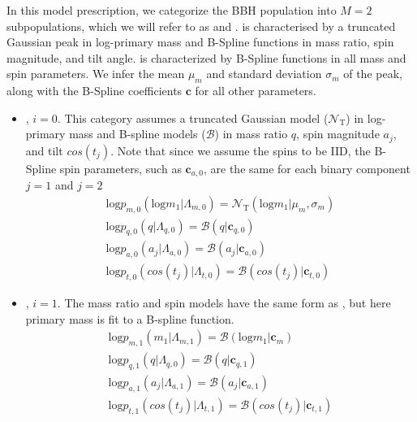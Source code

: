 \subsubsection{\base{}}
In this model prescription, we categorize the BBH population into $M=2$ subpopulations, which we will refer to as \popA{} and \popB{}. \popA is characterised by a truncated Gaussian peak in log-primary mass and B-Spline functions in mass ratio, spin magnitude, and tilt angle. \popB{} is characterized by B-Spline functions in all mass and spin parameters. We infer the mean $\mu_m$ and standard deviation $\sigma_m$ of the peak, along with the B-Spline coefficients $\mathbf{c}$ for all other parameters.

\begin{itemize}
    \item \popA{}, $i=0$. This category assumes a truncated Gaussian model ($\mathcal{N}_\text{T}$) in log-primary mass and B-spline models ($\mathcal{B}$) in mass ratio $q$, spin magnitude $a_j$, and tilt $cos(t_j)$. Note that since we assume the spins to be IID, the B-Spline spin parameters, such as $\mathbf{c}_{a,0}$, are the same for each binary component $j=1$ and $j=2$
    \begin{eqnarray} \label{eq:peakAbase}
        \text{log} p_{m,0}(\text{log} m_1| \Lambda_{m,0}) = \mathcal{N}_\text{T}(\text{log}m_1 | \mu_{m}, \sigma_{m}) \\
        \text{log} p_{q,0}(q| \Lambda_{q,0}) = \mathcal{B}(q | \mathbf{c}_{q,0}) \\
        \text{log} p_{a,0}(a_j| \Lambda_{a,0}) = \mathcal{B}(a_j | \mathbf{c}_{a,0}) \\
        \text{log} p_{t,0}(cos(t_j)| \Lambda_{t,0}) = \mathcal{B}( cos(t_j) | \mathbf{c}_{t,0})
    \end{eqnarray}

    \item \popB{}, $i=1$. The mass ratio and spin models have the same form as \popA{}, but here primary mass is fit to a B-spline function. 
    \begin{eqnarray} \label{eq:contBbase}
        \text{log} p_{m,1}(m_1| \Lambda_{m,1}) = \mathcal{B}( \text{log} m_1 | \mathbf{c}_{m}) \\
        \text{log} p_{q,1}(q| \Lambda_{q,0}) = \mathcal{B}(q | \mathbf{c}_{q,1}) \\
        \text{log} p_{a,1}(a_j| \Lambda_{a,1}) = \mathcal{B}(a_j | \mathbf{c}_{a,1}) \\
        \text{log} p_{t,1}(cos(t_j)| \Lambda_{t,1}) = \mathcal{B}( cos(t_j) | \mathbf{c}_{t,1})
    \end{eqnarray}

\end{itemize}

